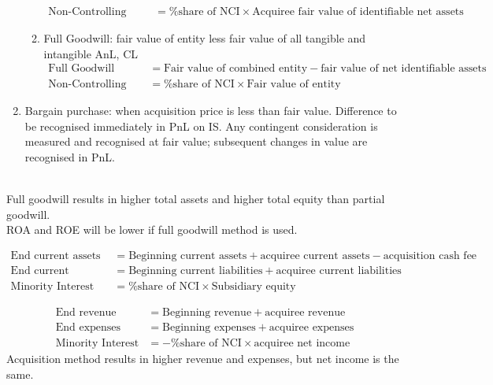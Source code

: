 \begin{method}
\begin{enumerate}[label=\roman*.]
\begin{enumerate}[label=\arabic*.]
\begin{align}
\text{Non-Controlling Interest} &= \text{\% share of NCI} \times \text{Acquiree fair value of identifiable net assets} \nonumber
\end{align}
\item Full Goodwill: fair value of entity less fair value of all tangible and intangible AnL, CL 
\begin{align}
\text{Full Goodwill} &= \text{Fair value of combined entity} - \text{fair value of net identifiable assets} \nonumber \\
\text{Non-Controlling Interest} &= \text{\% share of NCI} \times \text{Fair value of entity} \nonumber
\end{align}
\end{enumerate}
\item Bargain purchase: when acquisition price is less than fair value. Difference to be recognised immediately in PnL on IS. Any contingent consideration is measured and recognised at fair value; subsequent changes in value are recognised in PnL.
\end{enumerate}
\end{method}

\begin{remark}  \\
Full goodwill results in higher total assets and higher total equity than partial goodwill.\\
ROA and ROE will be lower if full goodwill method is used.
\end{remark}

\begin{method} 
\begin{align}
\text{End current assets} &= \text{Beginning current assets} + \text{acquiree current assets} - \text{acquisition cash fee} \nonumber \\
\text{End current liabilities} &= \text{Beginning current liabilities} + \text{acquiree current liabilities} \nonumber \\
\text{Minority Interest in Equity} &= \text{\% share of NCI} \times \text{Subsidiary equity} \nonumber
\end{align}
\end{method}

\begin{method} 
\begin{align}
\text{End revenue} &= \text{Beginning revenue} + \text{acquiree revenue} \nonumber \\
\text{End expenses} &= \text{Beginning expenses} + \text{acquiree expenses} \nonumber \\
\text{Minority Interest} &= - \text{\% share of NCI} \times \text{acquiree net income} \nonumber
\end{align}
Acquisition method results in higher revenue and expenses, but net income is the same.
\end{method}

